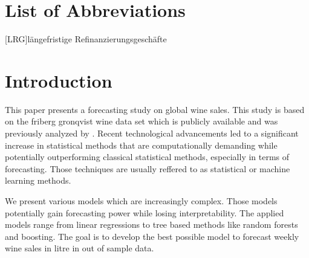\documentclass[11pt,]{article}
\begin{document}
\listoftables
{}

\section*{List of Abbreviations}

\begin{adjustwidth}{1.5em}{0pt}

\begin{acronym}[dummyyyy]
 [LRG]{längefristige Refinanzierungsgeschäfte}

\end{acronym}

\end{adjustwidth}

\newpage
{}
\hypertarget{introduction}{%
\section{Introduction}\label{introduction}}

This paper presents a forecasting study on global wine sales. This study
is based on the friberg gronqvist wine data set which is publicly
available and was previously analyzed by
\textcite[][p. 193f.]{Friberg2012}. Recent technological advancements
led to a significant increase in statistical methods that are
computationally demanding while potentially outperforming classical
statistical methods, especially in terms of forecasting. Those
techniques are usually reffered to as statistical or machine learning
methods.

We present various models which are increasingly complex. Those models
potentially gain forecasting power while losing interpretability. The
applied models range from linear regressions to tree based methods like
random forests and boosting. The goal is to develop the best possible
model to forecast weekly wine sales in litre in out of sample data.
\end{document}
